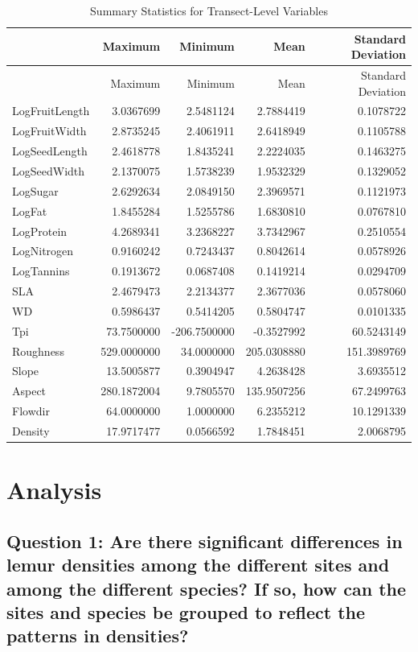 \documentclass[
  12pt,
]{article}
\begin{document}
\begin{longtable}[]{@{}lrrrr@{}}
\caption{Summary Statistics for Transect-Level Variables}\tabularnewline
\toprule
& Maximum & Minimum & Mean & Standard Deviation\tabularnewline
\midrule
\endfirsthead
\toprule
& Maximum & Minimum & Mean & Standard Deviation\tabularnewline
\midrule
\endhead
LogFruitLength & 3.0367699 & 2.5481124 & 2.7884419 &
0.1078722\tabularnewline
LogFruitWidth & 2.8735245 & 2.4061911 & 2.6418949 &
0.1105788\tabularnewline
LogSeedLength & 2.4618778 & 1.8435241 & 2.2224035 &
0.1463275\tabularnewline
LogSeedWidth & 2.1370075 & 1.5738239 & 1.9532329 &
0.1329052\tabularnewline
LogSugar & 2.6292634 & 2.0849150 & 2.3969571 & 0.1121973\tabularnewline
LogFat & 1.8455284 & 1.5255786 & 1.6830810 & 0.0767810\tabularnewline
LogProtein & 4.2689341 & 3.2368227 & 3.7342967 &
0.2510554\tabularnewline
LogNitrogen & 0.9160242 & 0.7243437 & 0.8042614 &
0.0578926\tabularnewline
LogTannins & 0.1913672 & 0.0687408 & 0.1419214 &
0.0294709\tabularnewline
SLA & 2.4679473 & 2.2134377 & 2.3677036 & 0.0578060\tabularnewline
WD & 0.5986437 & 0.5414205 & 0.5804747 & 0.0101335\tabularnewline
Tpi & 73.7500000 & -206.7500000 & -0.3527992 & 60.5243149\tabularnewline
Roughness & 529.0000000 & 34.0000000 & 205.0308880 &
151.3989769\tabularnewline
Slope & 13.5005877 & 0.3904947 & 4.2638428 & 3.6935512\tabularnewline
Aspect & 280.1872004 & 9.7805570 & 135.9507256 &
67.2499763\tabularnewline
Flowdir & 64.0000000 & 1.0000000 & 6.2355212 & 10.1291339\tabularnewline
Density & 17.9717477 & 0.0566592 & 1.7848451 & 2.0068795\tabularnewline
\bottomrule
\end{longtable}

\newpage

\hypertarget{analysis}{%
\section{Analysis}\label{analysis}}

\hypertarget{question-1-are-there-significant-differences-in-lemur-densities-among-the-different-sites-and-among-the-different-species-if-so-how-can-the-sites-and-species-be-grouped-to-reflect-the-patterns-in-densities}{%
\subsection{Question 1: Are there significant differences in lemur
densities among the different sites and among the different species? If
so, how can the sites and species be grouped to reflect the patterns in
densities?}\label{question-1-are-there-significant-differences-in-lemur-densities-among-the-different-sites-and-among-the-different-species-if-so-how-can-the-sites-and-species-be-grouped-to-reflect-the-patterns-in-densities}}
\end{document}
